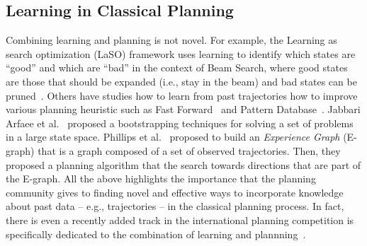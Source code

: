 \documentclass[12pt]{article}
\begin{document}

\subsection{Learning in Classical Planning}
Combining learning and planning is not novel. For example, the Learning as search optimization (LaSO) framework uses learning to identify which states are ``good'' and which are ``bad''
in the context of Beam Search, where good states are those that should be expanded (i.e., stay in the beam) and bad states can be pruned~\cite{xu2007discriminative}. 
Others have studies how to learn from past trajectories how to improve various planning heuristic such as Fast Forward~\cite{yoon2006learning} and Pattern Database~\cite{samadi2008learning}. Jabbari Arfaee et al.~\cite{arfaee2011learning} proposed a bootstrapping techniques for solving a set of problems in a large state space. 
Phillips et al.~\cite{phillips2012graphs} proposed to build an {\em Experience Graph} (E-graph) that is a graph composed of a set of observed trajectories. Then, they proposed a planning algorithm that the search towards directions that are part of the E-graph. All the above highlights the importance that the planning community gives to  finding novel and effective ways to incorporate knowledge about past data -- e.g., trajectories -- in the classical planning process. In fact, there is even a recently added track in the international planning competition is specifically dedicated to the combination of learning and plannning~\cite{fern2011first}.  
\end{document}
